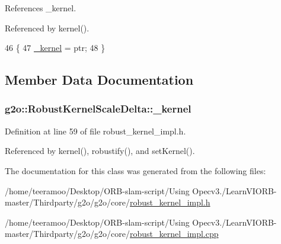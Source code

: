 References \+\_\+kernel.



Referenced by kernel().


\begin{DoxyCode}
46 \{
47   \hyperlink{classg2o_1_1RobustKernelScaleDelta_a4a2976cb5f12553f0e00dfdf239b1231}{\_kernel} = ptr;
48 \}
\end{DoxyCode}


\subsection{Member Data Documentation}
\subsubsection[{\texorpdfstring{\+\_\+kernel}{_kernel}}]{ g2o\+::\+Robust\+Kernel\+Scale\+Delta\+::\+\_\+kernel\hspace{0.3cm}{\ttfamily [protected]}}\hypertarget{classg2o_1_1RobustKernelScaleDelta_a4a2976cb5f12553f0e00dfdf239b1231}{}\label{classg2o_1_1RobustKernelScaleDelta_a4a2976cb5f12553f0e00dfdf239b1231}


Definition at line 59 of file robust\+\_\+kernel\+\_\+impl.\+h.



Referenced by kernel(), robustify(), and set\+Kernel().



The documentation for this class was generated from the following files\+:\begin{DoxyCompactItemize}
\item 
/home/teeramoo/\+Desktop/\+O\+R\+B-\/slam-\/script/\+Using Opecv3./\+Learn\+V\+I\+O\+R\+B-\/master/\+Thirdparty/g2o/g2o/core/\hyperlink{robust__kernel__impl_8h}{robust\+\_\+kernel\+\_\+impl.\+h}\item 
/home/teeramoo/\+Desktop/\+O\+R\+B-\/slam-\/script/\+Using Opecv3./\+Learn\+V\+I\+O\+R\+B-\/master/\+Thirdparty/g2o/g2o/core/\hyperlink{robust__kernel__impl_8cpp}{robust\+\_\+kernel\+\_\+impl.\+cpp}\end{DoxyCompactItemize}
